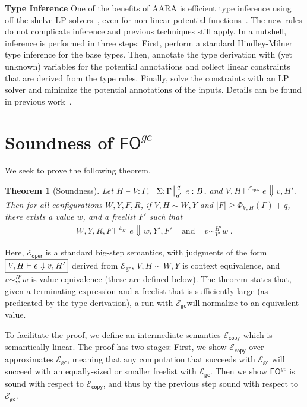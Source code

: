 \documentclass{easychair}
\newtheorem{theorem}{Theorem}
\newcommand{\ms}[1]{\ensuremath{\mathsf{#1}}}
\newcounter{rule}
\newcommand{\veq}[4]{#3 \sim^{#1}_{#2} #4}
\newcommand{\fogc}{\ms{FO}^{gc}}
\newcommand{\gcSem}{\ensuremath{\mathcal{E}_{\ms{gc}}}}
\newcommand{\copySem}{\ensuremath{\mathcal{E}_{\ms{copy}}}}
\theoremstyle{definition}
\begin{document}
{\bf Type Inference} One of the benefits of AARA is efficient type
inference using off-the-shelve LP solvers~\cite{Jost03}, even for
non-linear potential functions~\cite{HoffmannAH10,HoffmannW15}. The
new rules do not complicate inference and previous techniques still
apply. In a nutshell, inference is performed in three steps: First,
perform a standard Hindley-Milner type inference for the base
types. Then, annotate the type derivation with (yet unknown) variables
for the potential annotations and collect linear constraints that are
derived from the type rules. Finally, solve the constraints with an LP
solver and minimize the potential annotations of the inputs. Details
can be found in previous work~\cite{Jost03,HoffmannW15}.



\section{Soundness of $\fogc$}

We seek to prove the following theorem.

\begin{theorem}[Soundness]
\label{itm:soundness} Let $H \vDash V {:} \Gamma$, $\;\; \Sigma; \Gamma \sststile{q'}{q} e : B$,
and $V,H \vdash^{\mathcal{E}_{\ms{oper}}} e \Downarrow v, H'$.
Then for all configurations $W,Y,F,R$,
if $V,H \sim W,Y$ and $|F| \ge \Phi_{V,H}(\Gamma) + q$,
there exists a value $w$, and a freelist $F'$ such that
$$
\begin{array}{ccc}
	W,Y,R,F \vdash^{\gcSem} e \Downarrow w, Y', F'  & \text{ and } & \veq{H'}{Y'}{v}{w} \; .
\end{array}
$$
\end{theorem}

Here, $\mathcal{E}_{\ms{oper}}$ is a standard big-step semantics, with judgments of the form
$\fbox{$V,H \vdash e \Downarrow v,H'$}$
derived from \gcSem{}, $V,H \sim W,Y$ is context equivalence, and $\veq{H'}{Y'}{v}{w}$
is value equivalence (these are defined below). The theorem states that, given a terminating expression
and a freelist that is sufficiently large (as predicated by the type derivation), 
a run with \gcSem will normalize to an equivalent value.

To facilitate the proof, we define an intermediate semantics
\copySem{} which is semantically linear. The proof has two stages:
First, we show \copySem{} over-approximates \gcSem, meaning that any
computation that succeeds with \gcSem{} will succeed with an
equally-sized or smaller freelist with \gcSem{}. Then we show $\fogc$
is sound with respect to \copySem{}, and thus by the previous step sound with respect to
\gcSem{}.
\end{document}
